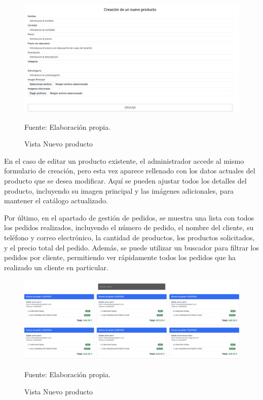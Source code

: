 \begin{figure}[H]
\begin{center}
\includegraphics[scale=0.5]{./Images/vistaAdminNuevoProducto.png}
\caption{Vista Nuevo producto} Fuente: Elaboración propia.

\label{fig:fig1}

\end{center}
\end{figure}

En el caso de editar un producto existente, el administrador accede al mismo formulario de creación, pero esta vez aparece rellenado con los datos actuales del producto que se desea modificar. Aquí se pueden ajustar todos los detalles del producto, incluyendo su imagen principal y las imágenes adicionales, para mantener el catálogo actualizado.

\vspace{0.5cm}

Por último, en el apartado de gestión de pedidos, se muestra una lista con todos los pedidos realizados, incluyendo el número de pedido, el nombre del cliente, su teléfono y correo electrónico, la cantidad de productos, los productos solicitados, y el precio total del pedido. Además, se puede utilizar un buscador para filtrar los pedidos por cliente, permitiendo ver rápidamente todos los pedidos que ha realizado un cliente en particular.

\begin{figure}[H]
\begin{center}
\includegraphics[scale=0.35]{./Images/vistaAdminPedidos.png}
\caption{Vista Nuevo producto} Fuente: Elaboración propia.

\label{fig:fig1}

\end{center}
\end{figure}

